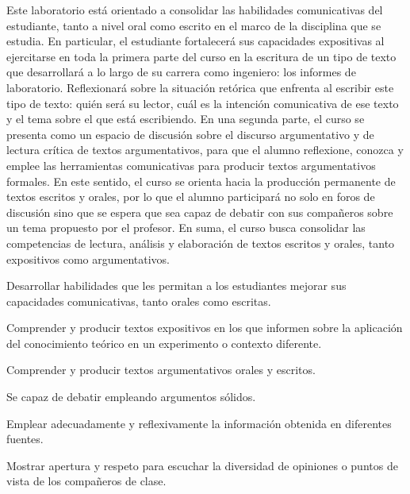 \begin{syllabus}


\begin{justification}
Este laboratorio está orientado a consolidar las habilidades comunicativas del estudiante, tanto a nivel oral como escrito en el marco de la disciplina que se estudia. En particular, el estudiante fortalecerá sus capacidades expositivas al ejercitarse en toda la primera parte del curso en la escritura de un tipo de texto que
desarrollará a lo largo de su carrera como ingeniero: los informes de laboratorio. Reflexionará sobre la situación retórica que enfrenta al escribir este tipo de texto: quién será su lector, cuál es la intención comunicativa de ese texto y el tema sobre el que está escribiendo.
En una segunda parte, el curso se presenta como un espacio de discusión sobre el discurso argumentativo y de lectura crítica de textos argumentativos, para que el alumno reflexione, conozca y emplee las herramientas comunicativas para producir textos argumentativos formales. En este sentido, el curso se orienta hacia la producción
permanente de textos escritos y orales, por lo que el alumno participará no solo en foros de discusión sino que se espera que sea capaz de debatir con sus compañeros sobre un tema propuesto por el profesor. En suma, el curso busca consolidar las competencias de lectura, análisis y elaboración de textos escritos y orales, tanto expositivos como argumentativos.
\end{justification}

\begin{goals}
\item Desarrollar habilidades que les permitan a los estudiantes mejorar sus capacidades comunicativas, tanto orales como escritas.
\item Comprender y producir textos expositivos en los que informen sobre la aplicación del conocimiento teórico en un experimento o contexto diferente.
\item Comprender y producir textos argumentativos orales y escritos.
\item Se capaz de debatir empleando argumentos sólidos.
\item Emplear adecuadamente y reflexivamente la información obtenida en diferentes fuentes.
\item Mostrar apertura y respeto para escuchar la diversidad de opiniones o puntos de vista de los compañeros de clase.
\end{goals}


\end{syllabus}
